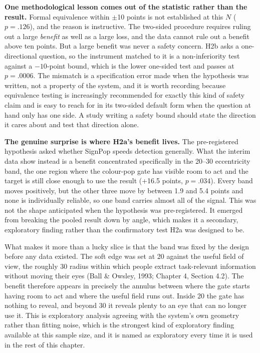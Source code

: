 \textbf{One methodological lesson comes out of the statistic rather than the result.} Formal
equivalence within $\pm$10 points is not established at this $N$ ($p = .126$), and the reason is
instructive. The two-sided procedure requires ruling out a large \textit{benefit} as well as a large
loss, and the data cannot rule out a benefit above ten points. But a large benefit was never a safety
concern. H2b asks a one-directional question, so the instrument matched to it is a non-inferiority
test against a $-10$-point bound, which is the lower one-sided test and passes at $p = .0006$. The
mismatch is a specification error made when the hypothesis was written, not a property of the system,
and it is worth recording because equivalence testing is increasingly recommended for exactly this
kind of safety claim \citep{lakens2017} and is easy to reach for in its two-sided default form when
the question at hand only has one side. A study writing a safety bound should state the direction it
cares about and test that direction alone.

\textbf{The genuine surprise is where H2a's benefit lives.} The pre-registered hypothesis asked
whether SignPop speeds detection generally. What the interim data show instead is a benefit
concentrated specifically in the 20--30\textdegree{} eccentricity band, the one region where the
colour-pop gate has visible room to act and the target is still close enough to use the result
(+16.5 points, $p = .034$). Every band moves positively, but the other three move by between 1.9 and
5.4 points and none is individually reliable, so one band carries almost all of the signal. This was
not the shape anticipated when the hypothesis was pre-registered. It emerged from breaking the
pooled result down by angle, which makes it a secondary, exploratory finding rather than the
confirmatory test H2a was designed to be.

What makes it more than a lucky slice is that the band was fixed by the design before any data
existed. The soft edge was set at 20\textdegree{} against the useful field of view, the roughly
30\textdegree{} radius within which people extract task-relevant information without moving their
eyes (Ball \& Owsley, 1993; Chapter 4, Section 4.2). The benefit therefore appears in precisely the
annulus between where the gate starts having room to act and where the useful field runs out. Inside
20\textdegree{} the gate has nothing to reveal, and beyond 30\textdegree{} it reveals plenty to an eye
that can no longer use it. This is exploratory analysis agreeing with the system's own geometry
rather than fitting noise, which is the strongest kind of exploratory finding available at this
sample size, and it is named as exploratory every time it is used in the rest of this chapter.


